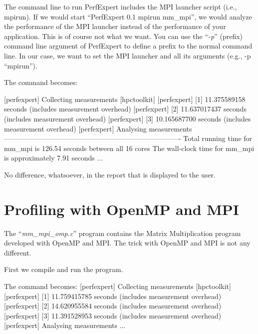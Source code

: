 \begin{prompt}
\end{prompt}

The command line to run PerfExpert includes the MPI launcher script (i.e., mpirun). If we would start ``PerfExpert 0.1 mpirun mm\_mpi'', we would analyze the performance of the MPI launcher instead of the performance of your application. This is of course not what we want. You can use the ``\textit{-p}'' (prefix) command line argument of PerfExpert to define a prefix to the normal command line. In our case, we want to set the MPI launcher and all its arguments (e.g., -p
``mpirun'').

The command becomes:

\begin{prompt}
[perfexpert] Collecting measurements [hpctoolkit]
[perfexpert]    [1] 11.375589158 seconds (includes measurement overhead)
[perfexpert]    [2] 11.637017437 seconds (includes measurement overhead)
[perfexpert]    [3] 10.165687700 seconds (includes measurement overhead)
[perfexpert] Analysing measurements
----------------------------------------------------------------------------
Total running time for mm_mpi is 126.54 seconds between all 16 cores
The wall-clock time for mm_mpi is approximately 7.91 seconds
...
\end{prompt}

No difference, whatsoever, in the report that is displayed to the user.

\section{Profiling with OpenMP and MPI}
\label{sec:Profiling_with_OpenMP_MPI}

The ``\textit{mm\_mpi\_omp.c}'' program contains the Matrix Multiplication program developed with OpenMP and MPI. The trick with OpenMP and MPI is not any different.

First we compile and run the program.

\begin{prompt}
The command becomes:
[perfexpert] Collecting measurements [hpctoolkit]
[perfexpert]    [1] 11.759415785 seconds (includes measurement overhead)
[perfexpert]    [2] 14.620955584 seconds (includes measurement overhead)
[perfexpert]    [3] 11.391528953 seconds (includes measurement overhead)
[perfexpert] Analysing measurements
...
\end{prompt}

